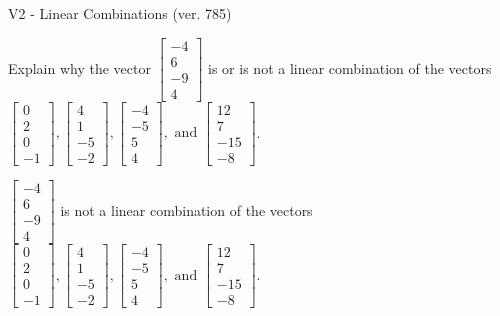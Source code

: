 \begin{exercise}
  \begin{exerciseTitle}V2 - Linear Combinations (ver. 785)\end{exerciseTitle}
  \begin{exerciseStatement}
    Explain why the vector \(\left[\begin{array}{c}
-4 \\
6 \\
-9 \\
4
\end{array}\right]\)  is or is not a linear 
	combination of the vectors \(\left[\begin{array}{c}
0 \\
2 \\
0 \\
-1
\end{array}\right] , \left[\begin{array}{c}
4 \\
1 \\
-5 \\
-2
\end{array}\right] , \left[\begin{array}{c}
-4 \\
-5 \\
5 \\
4
\end{array}\right] , \text{ and } \left[\begin{array}{c}
12 \\
7 \\
-15 \\
-8
\end{array}\right]\).
	


  \end{exerciseStatement}
  \begin{exerciseAnswer}
   \(\left[\begin{array}{c}
-4 \\
6 \\
-9 \\
4
\end{array}\right]\) 
  	 is not  
	a linear combination of the vectors \(\left[\begin{array}{c}
0 \\
2 \\
0 \\
-1
\end{array}\right] , \left[\begin{array}{c}
4 \\
1 \\
-5 \\
-2
\end{array}\right] , \left[\begin{array}{c}
-4 \\
-5 \\
5 \\
4
\end{array}\right] , \text{ and } \left[\begin{array}{c}
12 \\
7 \\
-15 \\
-8
\end{array}\right]\).


\end{exerciseAnswer}
\end{exercise}
